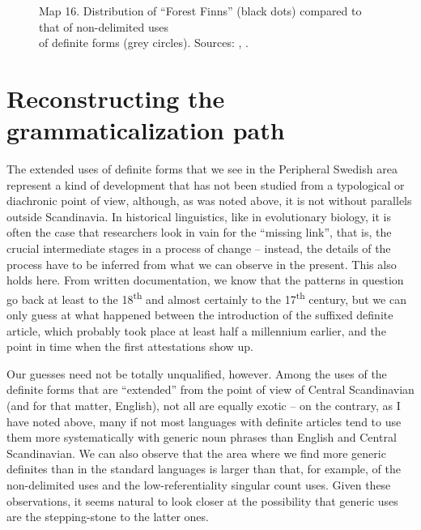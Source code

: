 

\begin{figure}[h]

\begin{minipage}{6.58333in}

\label{bkm:Ref135469955}Map 16. Distribution of “Forest Finns” (black dots) compared to that of non-delimited uses\\
 of definite forms (grey circles). Sources: \citet{Tarkiainen1990}, \citet{Broberg1980}.


\end{minipage}

\end{figure}

\section{\rmfamily Reconstructing the grammaticalization path}
\label{bkm:Ref154983462}
The extended uses of definite forms that we see in the Peripheral Swedish area represent a kind of development that has not been studied from a typological or diachronic point of view, although, as was noted above, it is not without parallels outside Scandinavia. In historical linguistics, like in evolutionary biology, it is often the case that researchers look in vain for the “missing link”, that is, the crucial intermediate stages in a process of change – instead, the details of the process have to be inferred from what we can observe in the present. This also holds here. From written documentation, we know that the patterns in question go back at least to the 18\textsuperscript{th} and almost certainly to the 17\textsuperscript{th} century, but we can only guess at what happened between the introduction of the suffixed definite article, which probably took place at least half a millennium earlier, and the point in time when the first attestations show up. 


Our guesses need not be totally unqualified, however. Among the uses of the definite forms that are “extended” from the point of view of Central Scandinavian (and for that matter, English), not all are equally exotic – on the contrary, as I have noted above, many if not most languages with definite articles tend to use them more systematically with generic noun phrases than English and Central Scandinavian. We can also observe that the area where we find more generic definites than in the standard languages is larger than that, for example, of the non-delimited uses and the low-referentiality singular count uses. Given these observations, it seems natural to look closer at the possibility that generic uses are the stepping-stone to the latter ones. 

